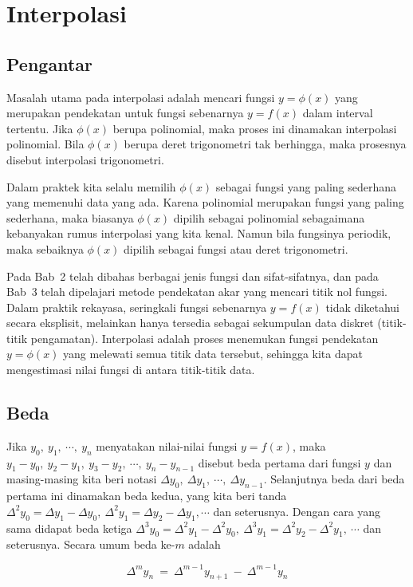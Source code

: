 \chapter{Interpolasi}
\section*{Pengantar}
Masalah utama pada interpolasi adalah mencari fungsi $y = \phi(x)$ yang merupakan pendekatan untuk fungsi sebenarnya $y = f(x)$ dalam interval tertentu. Jika $\phi(x)$ berupa polinomial, maka proses ini dinamakan interpolasi polinomial. Bila $\phi(x)$ berupa deret trigonometri tak berhingga, maka prosesnya disebut interpolasi trigonometri.

Dalam praktek kita selalu memilih $\phi(x)$ sebagai fungsi yang paling sederhana yang memenuhi data yang ada. Karena polinomial merupakan fungsi yang paling sederhana, maka biasanya $\phi(x)$ dipilih sebagai polinomial sebagaimana kebanyakan rumus interpolasi yang kita kenal. Namun bila fungsinya periodik, maka sebaiknya $\phi(x)$ dipilih sebagai fungsi atau deret trigonometri.

Pada Bab~2 telah dibahas berbagai jenis fungsi dan sifat-sifatnya, dan pada Bab~3 telah dipelajari metode pendekatan akar yang mencari titik nol fungsi. Dalam praktik rekayasa, seringkali fungsi sebenarnya $y = f(x)$ tidak diketahui secara eksplisit, melainkan hanya tersedia sebagai sekumpulan data diskret (titik-titik pengamatan). Interpolasi adalah proses menemukan fungsi pendekatan $y = \phi(x)$ yang melewati semua titik data tersebut, sehingga kita dapat mengestimasi nilai fungsi di antara titik-titik data.


\section{Beda}
Jika $y_0,~ y_1,~ \cdots,~ y_n$ menyatakan nilai-nilai fungsi $y=f(x)$, maka $y_1-y_0,~ y_2-y_1,~ y_3-y_2,~ \cdots,~ y_n-y_{n-1}$ disebut beda pertama dari fungsi $y$ dan masing-masing kita beri notasi $\Delta y_0,~ \Delta y_1,~ \cdots,~ \Delta y_{n-1}$. Selanjutnya beda dari beda pertama ini dinamakan beda kedua, yang kita beri tanda $\Delta^2 y_0 = \Delta y_1 - \Delta y_0,~ \Delta^2 y_1 = \Delta y_2 - \Delta y_1, \cdots$ dan seterusnya. Dengan cara yang sama didapat beda ketiga $\Delta^3 y_0 = \Delta^2 y_1 - \Delta^2 y_0,~ \Delta^3 y_1 = \Delta^2 y_2 - \Delta^2 y_1,~ \cdots$ dan seterusnya. Secara umum beda ke-$m$ adalah

\begin{equation}
\Delta^m y_n ~=~ \Delta^{m-1} y_{n+1} ~-~ \Delta^{m-1} y_n
\end{equation}

